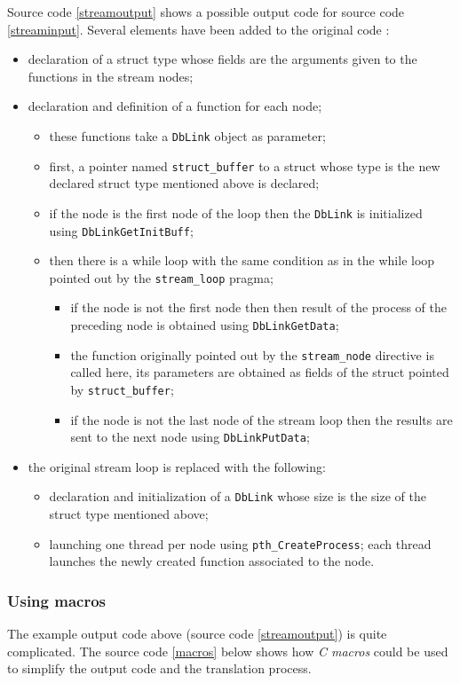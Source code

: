 \documentclass [A4]{article}
\begin{document}
	Source code \ref{streamoutput} shows a possible output code for source code \ref{streaminput}. Several elements have been added to the original code :
	\begin{itemize}
		\item declaration of a struct type whose fields are the arguments given to the functions in the stream nodes;
		\item declaration and definition of a function for each node; 
		\begin{itemize}
			\item these functions take a \verb+DbLink+ object as parameter;
			\item first, a pointer named \verb+struct_buffer+ to a struct whose type is the new declared struct type mentioned above is declared;
			\item if the node is the first node of the loop then the \verb+DbLink+ is initialized using \verb+DbLinkGetInitBuff+;
			\item then there is a while loop with the same condition as in the while loop pointed out by the \verb+stream_loop+ pragma;
			\begin{itemize}
				\item if the node is not the first node then then result of the process of the preceding node is obtained using \verb+DbLinkGetData+;
				\item the function originally pointed out by the \verb+stream_node+ directive is called here, its parameters are obtained as fields of the struct pointed by \verb+struct_buffer+;
				\item if the node is not the last node of the stream loop then the results are sent to the next node using \verb+DbLinkPutData+;
			\end{itemize}
		\end{itemize}
		\item the original stream loop is replaced with the following:
		\begin{itemize}
			\item declaration and initialization of a \verb+DbLink+ whose size is the size of the struct type mentioned above;
			\item launching one thread per node using \verb+pth_CreateProcess+; each thread launches the newly created function associated to the node.
		\end{itemize}
	\end{itemize}
	
	\subsubsection{Using macros}
	The example output code above (source code \ref{streamoutput}) is quite complicated. The source code \ref{macros} below shows how \emph{C macros} could be used to simplify the output code and the translation process.
	
\end{document}
